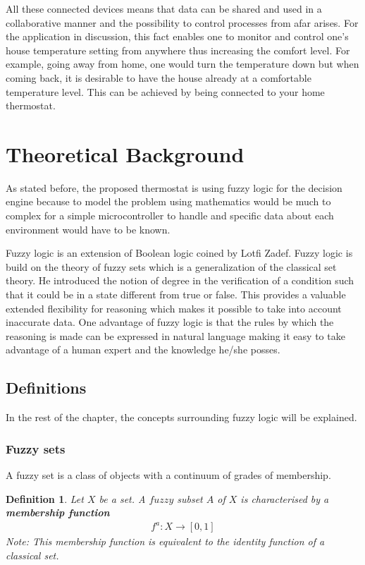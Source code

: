 \documentclass[conference]{IEEEtran}
\newtheorem{definition} {Definition}[section]
\let\Oldsection\section
\renewcommand{\section}{\FloatBarrier\Oldsection}
\let\Oldsubsection\subsection
\renewcommand{\subsection}{\FloatBarrier\Oldsubsection}
\let\Oldsubsubsection\subsubsection
\renewcommand{\subsubsection}{\FloatBarrier\Oldsubsubsection}
\begin{document}
All these connected devices means that data can be shared and used in a collaborative manner and the
possibility to control processes from afar arises. For the application in discussion, this fact enables one to
monitor and control one's house temperature setting from anywhere thus increasing the comfort level. For
example, going away from home, one would turn the temperature down but when coming back, it is desirable to
have the house already at a comfortable temperature level. This can be achieved by being connected to your
home thermostat.

\section{Theoretical Background}
\label{Theoretical Background}

As stated before, the proposed thermostat is using fuzzy logic for the decision engine because to model the
problem using mathematics would be much to complex for a simple microcontroller to handle and specific data
about each environment would have to be known.

Fuzzy logic is an extension of Boolean logic coined by Lotfi Zadef. Fuzzy logic is build on the theory of fuzzy sets which is
a generalization of the classical set theory. He introduced the notion of degree in the verification of a
condition such that it could be in a state different from true or false. This provides a valuable extended
flexibility for reasoning which makes it possible to take into account inaccurate data.
One advantage of fuzzy logic is that the rules by which the reasoning is made can be expressed in natural
language making it easy to take advantage of a human expert and the knowledge he/she posses.

\subsection{Definitions}

In the rest of the chapter, the concepts surrounding fuzzy logic will be explained.
\subsubsection{Fuzzy sets}

A fuzzy set is a class of objects with a continuum of grades of membership\cite{FuzzySets}.

\begin{definition}
\label{def:fuzzye_set}
Let $X$ be a set. A $fuzzy$ subset $A$ of $X$ is characterised by a \textbf{membership function}
\begin{align}
f^{a}: X \rightarrow [0, 1]
\end{align}
Note: This membership function is equivalent to the identity function of a classical set.
\end{definition}
\end{document}
